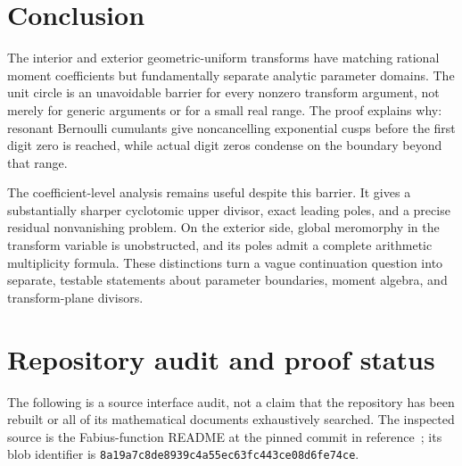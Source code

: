 \documentclass[11pt,a4paper]{article}
\numberwithin{equation}{section}
\theoremstyle{definition}
\theoremstyle{remark}
\begin{document}
\section{Conclusion}
The interior and exterior geometric-uniform transforms have matching rational moment coefficients but fundamentally separate analytic parameter domains. The unit circle is an unavoidable barrier for every nonzero transform argument, not merely for generic arguments or for a small real range. The proof explains why: resonant Bernoulli cumulants give noncancelling exponential cusps before the first digit zero is reached, while actual digit zeros condense on the boundary beyond that range.

The coefficient-level analysis remains useful despite this barrier. It gives a substantially sharper cyclotomic upper divisor, exact leading poles, and a precise residual nonvanishing problem. On the exterior side, global meromorphy in the transform variable is unobstructed, and its poles admit a complete arithmetic multiplicity formula. These distinctions turn a vague continuation question into separate, testable statements about parameter boundaries, moment algebra, and transform-plane divisors.

\clearpage
\appendix
\section{Repository audit and proof status}\label{sec:audit}
The following is a source interface audit, not a claim that the repository has been rebuilt or all of its mathematical documents exhaustively searched. The inspected source is the Fabius-function README at the pinned commit in reference~\cite{repo}; its blob identifier is
\texttt{\footnotesize 8a19a7c8de8939c4a55ec63fc443ce08d6fe74ce}.
\end{document}
